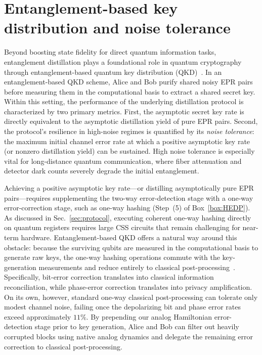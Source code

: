 \documentclass[onecolumn,prx,longbibliography,nofootinbib, superscriptaddress]{revtex4-2}
\theoremstyle{recap}
\begin{document}
\section{Entanglement-based key distribution and noise tolerance}\label{sec:tolerance}

Beyond boosting state fidelity for direct quantum information tasks, entanglement distillation plays a foundational role in quantum cryptography through entanglement-based quantum key distribution (QKD)~\cite{BDSW, ShorPreskill2000, gottesman2003two-way, devetak2005distillation}. In an entanglement-based QKD scheme, Alice and Bob purify shared noisy EPR pairs before measuring them in the computational basis to extract a shared secret key. Within this setting, the performance of the underlying distillation protocol is characterized by two primary metrics. First, the asymptotic secret key rate is directly equivalent to the asymptotic distillation yield of pure EPR pairs. Second, the protocol's resilience in high-noise regimes is quantified by its \emph{noise tolerance}: the maximum initial channel error rate at which a positive asymptotic key rate (or nonzero distillation yield) can be sustained. High noise tolerance is especially vital for long-distance quantum communication, where fiber attenuation and detector dark counts severely degrade the initial entanglement.

Achieving a positive asymptotic key rate---or distilling asymptotically pure EPR pairs---requires supplementing the two-way error-detection stage with a one-way error-correction stage, such as one-way hashing (Step~(5) of Box~\ref{box:HEDP}). As discussed in Sec.~\ref{sec:protocol}, executing coherent one-way hashing directly on quantum registers requires large CSS circuits that remain challenging for near-term hardware. Entanglement-based QKD offers a natural way around this obstacle: because the surviving qubits are measured in the computational basis to generate raw keys, the one-way hashing operations commute with the key-generation measurements and reduce entirely to classical post-processing~\cite{ShorPreskill2000, gottesman2003two-way, Liu2022classically}. Specifically, bit-error correction translates into classical information reconciliation, while phase-error correction translates into privacy amplification. On its own, however, standard one-way classical post-processing can tolerate only modest channel noise, failing once the depolarizing bit and phase error rates exceed approximately $11\%$. By prepending our analog Hamiltonian error-detection stage prior to key generation, Alice and Bob can filter out heavily corrupted blocks using native analog dynamics and delegate the remaining error correction to classical post-processing.
\end{document}
